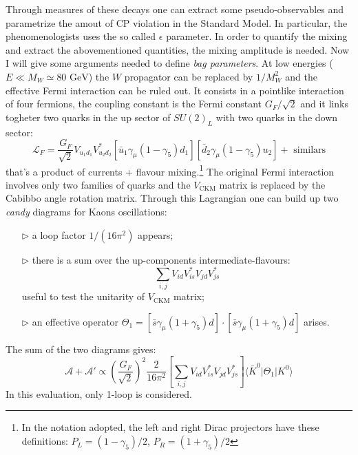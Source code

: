 \documentclass[english, LaM, oneside, noexaminfo]{sapthesis}
\newcommand{\la}{\langle}
\newcommand{\ra}{\rangle}
\newcommand{\gev}{\text{ GeV}}
\begin{document}
Through measures of these decays one can extract some pseudo-observables and parametrize the amout of CP violation in the Standard Model.
In particular, the phenomenologists uses the so called $\epsilon$ parameter\cite{Donoghue}.
In order to quantify the mixing and extract the abovementioned quantities, the mixing amplitude is needed.
Now I will give some arguments needed to define {\it bag parameters}.
\newline
At low energies ($E \ll M_W \simeq 80 \gev$) the $W$ propagator can be replaced by $1/M_W^2$ and the effective Fermi interaction can be ruled out.
It consists in a pointlike interaction of four fermions, the coupling constant is the Fermi constant $G_F/\sqrt{2}$ and it links togheter two quarks in the up sector of $SU(2)_L$ with two quarks in the down sector:
\begin{equation}\label{eq:Fermi-interaction}
    \mathcal{L}_F = \frac{G_F}{\sqrt{2}} V_{u_1 d_1} V_{u_2 d_2}^* \left[\bar u_1 \gamma_\mu (1-\gamma_5)d_1\right] \left[\bar d_2 \gamma_\mu (1-\gamma_5)u_2\right] + \text{ similars}
\end{equation}
that's a product of currents + flavour mixing.\footnote{In the notation adopted, the left and right Dirac projectors have these definitions: $P_L = (1-\gamma_5)/2$, $P_R = (1+\gamma_5)/2$} 
The original Fermi interaction involves only two families of quarks and the $V_{\text{CKM}}$ matrix is replaced by the Cabibbo angle rotation matrix.
Through this Lagrangian one can build up two \textit{candy} diagrams for Kaons oscillations:
\begin{itemize}
    \item [$\triangleright$] a loop factor $1/(16\pi^2)$ appears;
    \item [$\triangleright$] there is a sum over the up-components intermediate-flavours: $$\sum_{i,j} V_{id} V_{is}^* V_{jd} V_{js}^*$$ useful to test the unitarity of $V_\text{CKM}$ matrix;
    \item [$\triangleright$] an effective operator $\Theta_1 = \left[\bar s \gamma_\mu (1+\gamma_5) d\right] \cdot \left[ \bar s \gamma_\mu (1+\gamma_5) d \right]$ arises.
\end{itemize}
The sum of the two diagrams gives:
\begin{equation*}
    \mathcal{A} + \mathcal{A}' \propto \left(\frac{G_F}{\sqrt{2}}\right)^2 \frac{2}{16\pi^2} \left[\sum_{i,j} V_{id} V_{is}^* V_{jd} V_{js}^*\right] \la \bar K^0 | \Theta_1 | K^0 \ra
\end{equation*}
In this evaluation, only 1-loop is considered.
\end{document}
